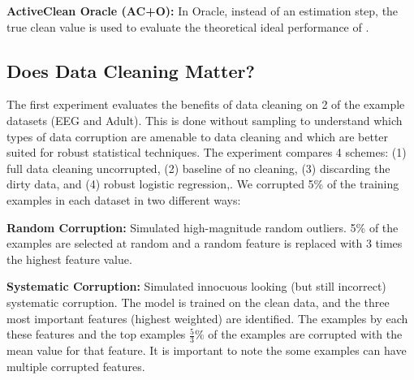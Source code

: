 \vspace{0.25em}

\noindent\textbf{ActiveClean Oracle (AC+O): } In \sys Oracle, instead of an estimation step, the true clean value is used to evaluate the theoretical ideal performance of \sys.

\subsection{Does Data Cleaning Matter?}
The first experiment evaluates the benefits of data cleaning on 2 of the example datasets (EEG and Adult).
This is done without sampling to understand which types of data corruption are amenable to data cleaning and which are better suited for robust statistical techniques.
The experiment compares 4 schemes: (1) full data cleaning uncorrupted, (2) baseline of no cleaning, (3) discarding the dirty data, and (4) robust logistic regression,. We corrupted 5\% of the training examples in each dataset in two different ways:

\vspace{0.5em}

\noindent\textbf{Random Corruption: } Simulated high-magnitude random outliers. 5\% of the examples are selected at random and a random feature is replaced with 3 times the highest feature value.

\vspace{0.5em}

\noindent\textbf{Systematic Corruption: } Simulated innocuous looking (but still incorrect) systematic corruption. The model is trained on the clean data, and the three most important features (highest weighted) are identified. The examples by each these features and the top examples $\frac{5}{3}\%$ of the examples are corrupted with the mean value for that feature. 
It is important to note the some examples can have multiple corrupted features.

